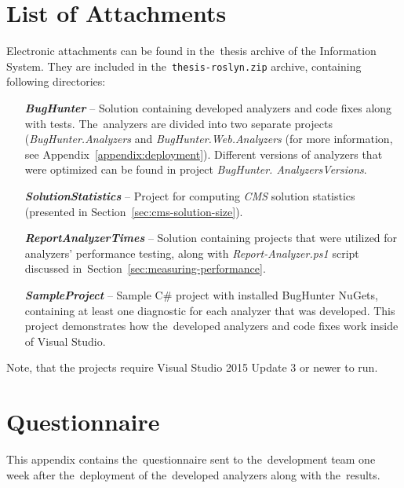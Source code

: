 \documentclass[
  digital, %
  table,   %
  lof,     %
  lot,     %
  oneside,
]{fithesis3}
\begin{document}
\chapter{List of Attachments}
\label{appendix:source-codes}
Electronic attachments can be found in the~thesis archive of the Information System. They are included in the~\texttt{thesis-roslyn.zip} archive, containing following directories:

\begin{itemize}
\item[\textit{\textbf{BugHunter}}] -- Solution containing developed analyzers and code fixes along with tests. The~analyzers are divided into two separate projects (\textit{BugHunter.Analyzers} and \textit{BugHunter.Web.Analyzers} (for more information, see Appendix~\ref{appendix:deployment}). Different versions of analyzers that were optimized can be found in project \textit{BugHunter. AnalyzersVersions}.

\item[\textit{\textbf{SolutionStatistics}}] -- Project for computing \textit{CMS} solution statistics (presented in Section~\ref{sec:cms-solution-size}).

\item[\textit{\textbf{ReportAnalyzerTimes}}] -- Solution containing projects that were utilized for analyzers' performance testing, along with \textit{Report-Analyzer.ps1} script discussed in~Section~\ref{sec:measuring-performance}.

\item[\textit{\textbf{SampleProject}}] -- Sample C\# project with installed BugHunter NuGets, containing at least one diagnostic for each analyzer that was developed. This project demonstrates how the~developed analyzers and code fixes work inside of Visual Studio.
\end{itemize}

Note, that the projects require Visual Studio 2015 Update 3 or newer to run. 

\chapter{Questionnaire}
\label{appendix:questionnaire}
This appendix contains the~questionnaire sent to the~development team one week after the~deployment of the~developed analyzers along with the~results.
\end{document}
